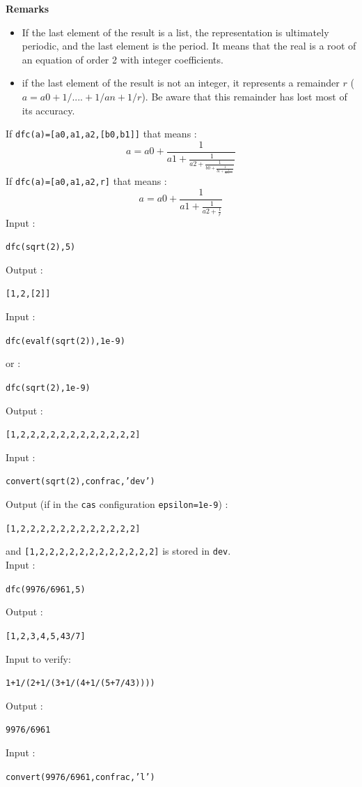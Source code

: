 \documentclass[a4paper,11pt]{book}
\begin{document}
{\bf Remarks} 
\begin{itemize}
\item If the last element of the result is a list, the representation is 
ultimately periodic, and the last element is the period. It means
that the real is a root of an equation of order 2 with integer
coefficients.
\item if the last element of the result is not an integer, it 
represents a remainder $r$ ($a=a0+1/....+1/an+1/r$). Be aware
that this remainder has lost most of its accuracy.
\end{itemize}
If  {\tt dfc(a)=[a0,a1,a2,[b0,b1]]} that means :
\[
a=a0+\frac{1}{a1+\frac{1}{a2+\frac{1}{b0+\frac{1}{b1+\frac{1}{b0+...}}}}} 
\]
If {\tt dfc(a)=[a0,a1,a2,r]} that means :
\[ a=a0+\frac{1}{a1+\frac{1}{a2+\frac{1}{r}}} \]
Input :
\begin{center}{\tt dfc(sqrt(2),5)}\end{center}
Output :
\begin{center}{\tt [1,2,[2]]}\end{center} 
Input :
\begin{center}{\tt dfc(evalf(sqrt(2)),1e-9)}\end{center}
or : 
\begin{center}{\tt dfc(sqrt(2),1e-9)}\end{center}
Output :
\begin{center}{\tt [1,2,2,2,2,2,2,2,2,2,2,2,2]}\end{center} 
Input :
\begin{center}{\tt convert(sqrt(2),confrac,'dev')}\end{center}
Output (if in the {\tt cas} configuration {\tt epsilon=1e-9}) :
\begin{center}{\tt [1,2,2,2,2,2,2,2,2,2,2,2,2]}\end{center} 
and  {\tt [1,2,2,2,2,2,2,2,2,2,2,2,2]} is stored in {\tt dev}.\\
Input :
\begin{center}{\tt dfc(9976/6961,5)}\end{center}
Output :
\begin{center}{\tt [1,2,3,4,5,43/7]}\end{center} 
Input to verify:
\begin{center}{\tt 1+1/(2+1/(3+1/(4+1/(5+7/43))))}\end{center}
Output :
\begin{center}{\tt 9976/6961}\end{center}
Input :
\begin{center}{\tt convert(9976/6961,confrac,'l')}\end{center}
\end{document}
